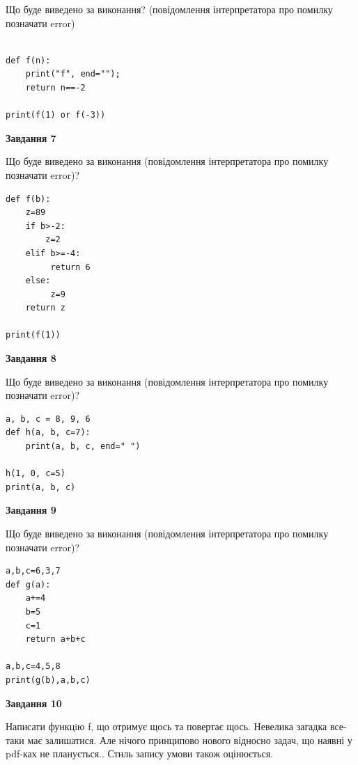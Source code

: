 \documentclass[12pt, ukrainian]{article}
\begin{document}
{\begin {large}
Що буде виведено за виконання? (повідомлення інтерпретатора про помилку позначати error)\par
\begin{verbatim}

def f(n):
    print("f", end="");
    return n==-2

print(f(1) or f(-3))
\end{verbatim}

{\begin {center}\textbf{Завдання 7}\end {center}}

Що буде виведено за виконання (повідомлення інтерпретатора про помилку позначати error)?\par
\begin{verbatim}
def f(b):
    z=89
    if b>-2: 
        z=2
    elif b>=-4:
         return 6
    else:
         z=9
    return z

print(f(1))
\end{verbatim}

{\begin {center}\textbf{Завдання 8}\end {center}}

Що буде виведено за виконання (повідомлення інтерпретатора про помилку позначати error)?\par
\begin{verbatim}
a, b, c = 8, 9, 6
def h(a, b, c=7):
    print(a, b, c, end=" ")

h(1, 0, c=5)
print(a, b, c)
\end{verbatim}

{\begin {center}\textbf{Завдання 9}\end {center}}

Що буде виведено за виконання (повідомлення інтерпретатора про помилку позначати error)?\par
\begin{verbatim}
a,b,c=6,3,7
def g(a):
    a+=4
    b=5
    c=1
    return a+b+c

a,b,c=4,5,8
print(g(b),a,b,c)
\end{verbatim}

{\begin {center}\textbf{Завдання 10}\end {center}}


Написати функцiю f, що отримує щось та повертає щось. Невелика загадка все-таки має залишатися. Але нічого принципово нового відносно задач, що наявні у pdf-ках не планується.. Стиль запису умови також оцінюється.\par
\end {large}}
\newpage
\end{document}
